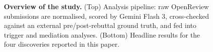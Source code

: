 \documentclass{article}
\begin{document}
%
%
%
%
%
%
\begin{figure}[t]
  \centering
  \caption{\textbf{Overview of the study.} (Top) Analysis pipeline:
    raw OpenReview submissions are normalised, scored by Gemini Flash 3,
    cross-checked against an external pre/post-rebuttal ground truth, and
    fed into trigger and mediation analyses. (Bottom) Headline results
    for the four discoveries reported in this paper.}
  \label{fig:f1-overview}
\end{figure}
\end{document}
